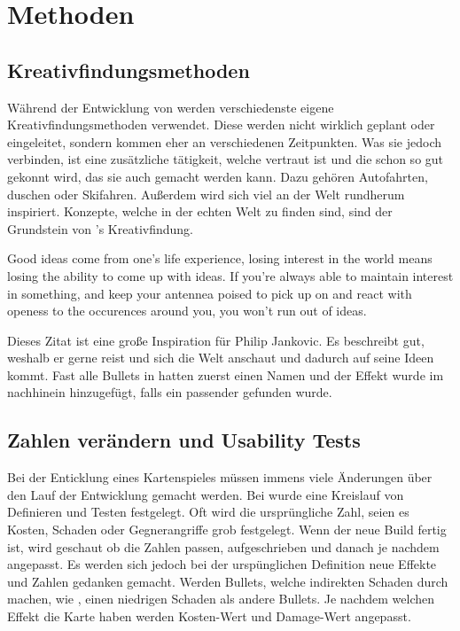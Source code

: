 
\section{Methoden}\label{sec:methoden}

\renewcommand{\kapitelautor}{Autor: Philip Jankovic}

%

\subsection{Kreativfindungsmethoden}\label{subsec:kreativfindungsmethoden}

Während der Entwicklung von \FF werden verschiedenste eigene Kreativfindungsmethoden verwendet. Diese werden nicht wirklich
geplant oder eingeleitet, sondern kommen eher an verschiedenen Zeitpunkten. Was sie jedoch verbinden, ist eine zusätzliche
tätigkeit, welche vertraut ist und die schon so gut gekonnt wird, das sie auch  gemacht werden kann.
Dazu gehören \zB Autofahrten, duschen oder Skifahren. Außerdem wird sich viel an der Welt rundherum inspiriert.
Konzepte, welche in der echten Welt zu finden sind, sind der Grundstein von \FF's Kreativfindung.

\begin{coolQuote}
Good ideas come from one's life experience, losing interest in the world means losing the ability to come up with ideas.
If you're always able to maintain interest in something, and keep your antennea poised to pick up on and react with openess
to the occurences around you, you won't run out of ideas.
\end{coolQuote}

Dieses Zitat ist eine große Inspiration für Philip Jankovic. Es beschreibt gut, weshalb er gerne reist und sich die Welt
anschaut und dadurch auf seine Ideen kommt. Fast alle Bullets in \FF hatten zuerst einen Namen und der Effekt wurde
im nachhinein hinzugefügt, falls ein passender gefunden wurde.


\subsection{Zahlen verändern und Usability Tests}\label{subsec:usability}

Bei der Enticklung eines Kartenspieles müssen immens viele Änderungen über den Lauf der Entwicklung gemacht werden.
Bei \FF wurde eine Kreislauf von Definieren und Testen festgelegt. Oft wird die ursprüngliche Zahl, seien es Kosten,
Schaden oder Gegnerangriffe grob festgelegt. Wenn der neue Build fertig ist, wird geschaut ob die Zahlen passen, aufgeschrieben und danach
je nachdem angepasst. Es werden sich jedoch bei der urspünglichen Definition neue Effekte und Zahlen gedanken gemacht.
\zB Werden Bullets, welche indirekten Schaden durch \zB {} machen, wie , einen niedrigen Schaden als andere Bullets.
Je nachdem welchen Effekt die Karte haben werden Kosten-Wert und Damage-Wert angepasst.




%

\renewcommand{\kapitelautor}{}
